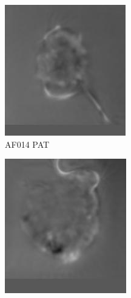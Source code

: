 \begin{figure}
\centering
\begin{subfigure}[b]{.24\linewidth}
\includegraphics[width=\linewidth]{Figs/PAT014_18.jpg}
\caption{AF014 PAT}
\end{subfigure}
\begin{subfigure}[b]{.24\linewidth}
\includegraphics[width=\linewidth]{Figs/PAT023_23.jpg}

\end{subfigure}
\end{figure}
